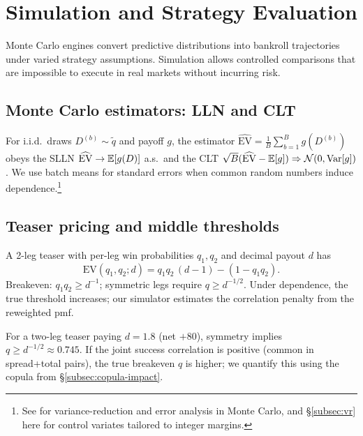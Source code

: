 \chapter{Simulation and Strategy Evaluation}
\label{chap:sim}

Monte Carlo engines convert predictive distributions into bankroll trajectories under varied strategy assumptions. Simulation allows controlled comparisons that are impossible to execute in real markets without incurring risk.

\section{Monte Carlo estimators: LLN and CLT}\label{sec:mc-lln}
For i.i.d.\ draws $D^{(b)}\sim \tilde q$ and payoff $g$, the estimator
$\widehat{\mathrm{EV}}=\tfrac1B\sum_{b=1}^B g(D^{(b)})$ obeys the SLLN
$\widehat{\mathrm{EV}}\to \mathbb{E}[g(D)]$ a.s.\ and the CLT
$\sqrt{B}(\widehat{\mathrm{EV}}-\mathbb{E}[g])\Rightarrow \mathcal{N}(0,\mathrm{Var}[g])$.
We use batch means for standard errors when common random numbers induce dependence.\footnote{See \citet{glasserman2003} for variance-reduction and error analysis in Monte Carlo, and \S\ref{subsec:vr} here for control variates tailored to integer margins.}

\section{Teaser pricing and middle thresholds}\label{sec:teaser-math}
A 2-leg teaser with per-leg win probabilities $q_1,q_2$ and decimal payout $d$ has
\begin{equation}\label{eq:teaser-ev}
\mathrm{EV}(q_1,q_2;d)=q_1q_2\,(d-1)-(1-q_1q_2).
\end{equation}
Breakeven: $q_1q_2\ge d^{-1}$; symmetric legs require $q\ge d^{-1/2}$. Under dependence, the
true threshold increases; our simulator estimates the correlation penalty from the reweighted pmf.

\begin{example}
For a two-leg teaser paying $d=1.8$ (net $+80$), symmetry implies $q\ge d^{-1/2}\approx 0.745$. If the joint success correlation is positive (common in spread+total pairs), the true breakeven $q$ is higher; we quantify this using the copula from \S\ref{subsec:copula-impact}.
\end{example}

